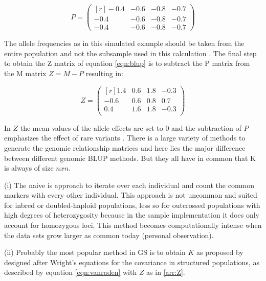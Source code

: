\begin{equation}
  P = 
  \begin{pmatrix}[r]
   -0.4 & -0.6 & -0.8 & -0.7 \\
   -0.4 & -0.6 & -0.8 & -0.7 \\
   -0.4 & -0.6 & -0.8 & -0.7
  \end{pmatrix}
  \label{arr:P}
\end{equation}

The allele frequencies as in this simulated example should be taken from the entire population and not the
subsample used in this calculation \cite{vanraden2008efficient}.  The final step to obtain the Z matrix of
equation \ref{eqn:blup} is to subtract the P matrix from the M matrix $Z= M - P$ resulting in:

\begin{equation}
  Z = 
  \begin{pmatrix}[r]
    1.4 & 0.6 & 1.8 & -0.3 \\
   -0.6 & 0.6 & 0.8 & 0.7 \\
    0.4 & 1.6 & 1.8 & -0.3 \\

  \end{pmatrix}
  \label{arr:Z}
\end{equation}

In $Z$ the mean values of the allele effects are set to 0 and the subtraction of $P$ emphasizes the effect of
rare variants \cite{vanraden2008efficient}.  There is a large variety of methods to generate the genomic
relationship matrices and here lies the major difference between different genomic BLUP methods. But they all
have in common that K is always of size $n x n$.

(i) The naive is approach to iterate over each individual and count the common markers with every other
individual. This approach is not uncommon and suited for inbred or doubled-haploid populations, less so for
outcrossed populations with high degrees of heterozygosity because in the sample implementation it does only
account for homozygous loci. This method becomes computationally intense when the data sets grow larger as
common today (personal observation).

(ii) Probably the most popular method in GS is to obtain $K$ as proposed by \cite{vanraden2008efficient} designed after Wright's \cite{wright1922coefficients} equations for the covariance in structured populations, as described by equation \ref{eqn:vanraden} with $Z$ as in \ref{arr:Z}.

